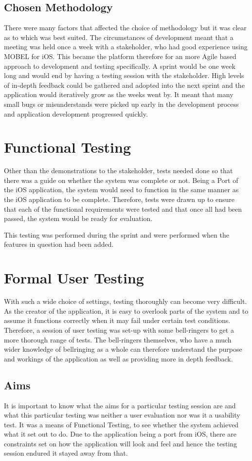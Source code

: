 \documentclass{l4proj}
\begin{document}
\subsection{Chosen Methodology}
There were many factors that affected the choice of methodology but it was clear as to which was best suited. The circumstances of development meant that a meeting was held once a week with a stakeholder, who had good experience using MOBEL for iOS.  This became the platform therefore for an more Agile based approach to development and testing specifically. A sprint would be one week long and would end by having a testing session with the stakeholder. High levels of in-depth feedback could be gathered and adopted into the next sprint and the application would iteratively grow as the weeks  went by. It meant that many small bugs or misunderstands were picked up early in the development process and application development progressed quickly.

\section{Functional Testing}
Other than the demonstrations to the stakeholder, tests needed done so that there was a guide on whether the system was complete or not.  Being a Port of the iOS application, the system would need to function in the same manner as the iOS application to be complete.  Therefore, tests were drawn up to ensure that each of the functional requirements were tested and that once all had been passed, the system would be ready for evaluation.

This testing was performed during the sprint and were performed when the features in question had been added.


\section{Formal User Testing}
With such a wide choice of settings, testing thoroughly can become very difficult.  As the creator of the application, it is easy to overlook parts of the system and to assume it functions correctly when it may fail under certain test conditions.  Therefore, a session of user testing was set-up with some bell-ringers to get a more thorough range of tests.  The bell-ringers themselves, who have a much wider knowledge of bellringing as a whole can therefore understand the purpose and workings of the application as well as providing more in depth feedback.

\subsection{Aims}
It is important to know what the aims for a particular testing session are and what this particular testing was neither a user evaluation nor was it a usability test.  It was a means of Functional Testing, to see whether the system achieved what it set out to do.  Due to the application being a port from iOS, there are constraints set on how the application will look and feel and hence the testing session endured it stayed away from that.
\end{document}
